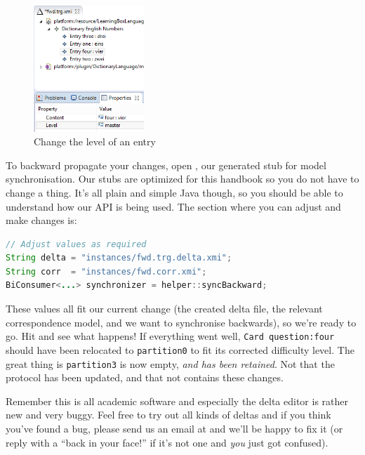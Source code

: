 \begin{stepbystep}
\begin{figure}[htbp]
\begin{center}
  \includegraphics[width=0.37\textwidth]{../../org.moflon.doc.handbook.04_tripleGraphTransformations/7_synchronization/sImages/trgDelta}
  \caption{Change the level of an entry}
  \label{fig:trgDelta}
\end{center}
\end{figure}

\item To backward propagate your changes, open
, our generated stub for model synchronisation.
Our stubs are optimized for this handbook so you do not have to change a thing.
It's all plain and simple Java though, so you should be able to understand
how our API is being used.
The section where you can adjust and make changes is:
\begin{lstlisting}[language=Java]
// Adjust values as required
String delta = "instances/fwd.trg.delta.xmi";
String corr  = "instances/fwd.corr.xmi";
BiConsumer<...> synchronizer = helper::syncBackward;
\end{lstlisting}

These values all fit our current change (the created delta file, the relevant correspondence model, and we want to synchronise backwards), so we're ready to go.
Hit  and see what happens!
If everything went well, \texttt{Card question:four} should have been relocated to \texttt{partition0} to fit its corrected difficulty level.
The great thing is \texttt{partition3} is now empty, \emph{and has been retained}.
Not that the protocol has been updated, and that  not contains these changes.
\end{stepbystep}

Remember this is all academic software and especially the delta editor is rather new and very buggy.
Feel free to try out all kinds of deltas and if you think you've found a bug, please send us an email at \emoflonMail and we'll be happy to fix it (or reply with a \enquote{back in your face!} if it's not one and \emph{you} just got confused).
